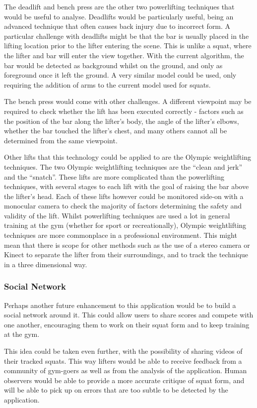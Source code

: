 The deadlift and bench press are the other two powerlifting techniques that would be useful to analyse. Deadlifts would be particularly useful, being an advanced technique that often causes back injury due to incorrect form. A particular challenge with deadlifts might be that the bar is usually placed in the lifting location prior to the lifter entering the scene. This is unlike a squat, where the lifter and bar will enter the view together. With the current algorithm, the bar would be detected as background whilst on the ground, and only as foreground once it left the ground. A very similar model could be used, only requiring the addition of arms to the current model used for squats.

The bench press would come with other challenges. A different viewpoint may be required to check whether the lift has been executed correctly - factors such as the position of the bar along the lifter's body, the angle of the lifter's elbows, whether the bar touched the lifter's chest, and many others cannot all be determined from the same viewpoint.

Other lifts that this technology could be applied to are the Olympic weightlifting techniques. The two Olympic weightlifting techniques are the ``clean and jerk'' and the ``snatch''. These lifts are more complicated than the powerlifting techniques, with several stages to each lift with the goal of raising the bar above the lifter's head. Each of these lifts however could be monitored side-on with a monocular camera to check the majority of factors determining the safety and validity of the lift. Whilst powerlifting techniques are used a lot in general training at the gym (whether for sport or recreationally), Olympic weightlifting techniques are more commonplace in a professional environment. This might mean that there is scope for other methods such as the use of a stereo camera or Kinect to separate the lifter from their surroundings, and to track the technique in a three dimensional way. 

\subsubsection{Social Network}

Perhaps another future enhancement to this application would be to build a social network around it. This could allow users to share scores and compete with one another, encouraging them to work on their squat form and to keep training at the gym.

This idea could be taken even further, with the possibility of sharing videos of their tracked squats. This way lifters would be able to receive feedback from a community of gym-goers as well as from the analysis of the application. Human observers would be able to provide a more accurate critique of squat form, and will be able to pick up on errors that are too subtle to be detected by the application.


